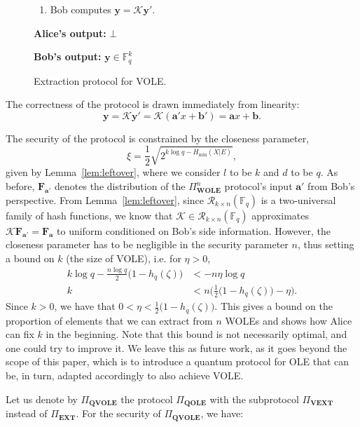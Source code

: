 \begin{figure}[h!]
\begin{tcolorbox}
\begin{enumerate}
    \item Bob computes $\bm{y} = \mathcal{K}\bm{y}'$.
\end{enumerate}

\textbf{Alice's output:} $\bot$

\textbf{Bob's output:} $\bm{y}\in \mathbb{F}^k_q$
        
        \end{tcolorbox}
\caption{Extraction protocol  for VOLE.}
\label{fig:vext}
\end{figure}


The correctness of the protocol is drawn immediately from linearity:
\begin{equation*}
\bm{y} = \mathcal{K} \bm{y}'
= \mathcal{K}(\bm{a}'x + \bm{b}')
= \bm{a}x + \bm{b}.
\end{equation*}

The security of the protocol is constrained by the closeness parameter, $$\xi = \frac{1}{2}\sqrt{2^{k\log q - H_\text{min}(X|E)}},$$ given by Lemma~\ref{lem:leftover}, where we consider $l$ to be $k$ and $d$ to be $q$. As before, $\mathbf{F}_{\bm{a}'}$ denotes the distribution of the $\Pi^n_{\textbf{WOLE}}$ protocol's input ${\bm{a}'}$ from Bob's perspective. From Lemma~\ref{lem:leftover}, since $\mathcal{R}_{k\times n}(\mathbb{F}_q)$ is a two-universal family of hash functions, we know that $\mathcal{K}\in \mathcal{R}_{k\times n}(\mathbb{F}_q)$ approximates $\mathcal{K}\mathbf{F}_{\bm{a}'} = \mathbf{F}_{\bm{a}}$ to uniform conditioned on Bob's side information. However, the closeness parameter has to be negligible in the security parameter $n$, thus setting a bound on $k$ (the size of VOLE), i.e. for $\eta > 0$,
\begin{align*}
k \log q - \frac{n \log q}{2}\big(1-h_{q}(\zeta)\big) &< -n \eta \log q\\
k &< n \Big(\frac{1}{2}\big(1-h_q(\zeta)\big) - \eta\Big).
\end{align*}
Since $k>0$, we have that  $ 0 < \eta < \frac{1}{2}\big(1-h_q(\zeta)\big)$. This gives a bound on the proportion of elements that we can extract from $n$ WOLEs  and  shows how Alice can fix $k$ in the beginning.  Note that this bound is not necessarily optimal, and one could try to improve it. We leave this as future work, as it goes beyond the scope of this paper, which is to introduce a quantum protocol for OLE that can be, in turn, adapted accordingly to also achieve VOLE.

Let us denote by $\Pi_{\textbf{QVOLE}}$ the protocol $\Pi_{\textbf{QOLE}}$ with the subprotocol $\Pi_{\textbf{VEXT}}$ instead of $\Pi_{\textbf{EXT}}$. For the security of $\Pi_{\textbf{QVOLE}}$, we have:

